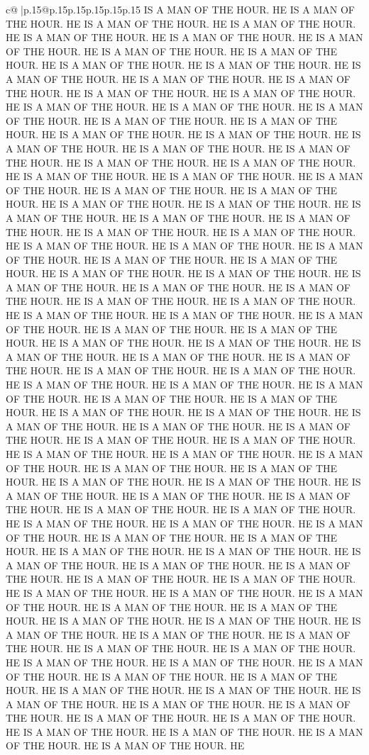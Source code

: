 \documentclass{article}
\begin{document}
{\begin{supertabular}{c@{$\;$}|p{.15\linewidth}@{}p{.15\linewidth}p{.15\linewidth}p{.15\linewidth}p{.15\linewidth}p{.15\linewidth}}
{{{IS A MAN OF THE HOUR. HE IS A MAN OF THE HOUR. HE IS A MAN OF THE HOUR. HE IS A MAN OF THE HOUR. HE IS A MAN OF THE HOUR. HE IS A MAN OF THE HOUR. HE IS A MAN OF THE HOUR. HE IS A MAN OF THE HOUR. HE IS A MAN OF THE HOUR. HE IS A MAN OF THE HOUR. HE IS A MAN OF THE HOUR. HE IS A MAN OF THE HOUR. HE IS A MAN OF THE HOUR. HE IS A MAN OF THE HOUR. HE IS A MAN OF THE HOUR. HE IS A MAN OF THE HOUR. HE IS A MAN OF THE HOUR. HE IS A MAN OF THE HOUR. HE IS A MAN OF THE HOUR. HE IS A MAN OF THE HOUR. HE IS A MAN OF THE HOUR. HE IS A MAN OF THE HOUR. HE IS A MAN OF THE HOUR. HE IS A MAN OF THE HOUR. HE IS A MAN OF THE HOUR. HE IS A MAN OF THE HOUR. HE IS A MAN OF THE HOUR. HE IS A MAN OF THE HOUR. HE IS A MAN OF THE HOUR. HE IS A MAN OF THE HOUR. HE IS A MAN OF THE HOUR. HE IS A MAN OF THE HOUR. HE IS A MAN OF THE HOUR. HE IS A MAN OF THE HOUR. HE IS A MAN OF THE HOUR. HE IS A MAN OF THE HOUR. HE IS A MAN OF THE HOUR. HE IS A MAN OF THE HOUR. HE IS A MAN OF THE HOUR. HE IS A MAN OF THE HOUR. HE IS A MAN OF THE HOUR. HE IS A MAN OF THE HOUR. HE IS A MAN OF THE HOUR. HE IS A MAN OF THE HOUR. HE IS A MAN OF THE HOUR. HE IS A MAN OF THE HOUR. HE IS A MAN OF THE HOUR. HE IS A MAN OF THE HOUR. HE IS A MAN OF THE HOUR. HE IS A MAN OF THE HOUR. HE IS A MAN OF THE HOUR. HE IS A MAN OF THE HOUR. HE IS A MAN OF THE HOUR. HE IS A MAN OF THE HOUR. HE IS A MAN OF THE HOUR. HE IS A MAN OF THE HOUR. HE IS A MAN OF THE HOUR. HE IS A MAN OF THE HOUR. HE IS A MAN OF THE HOUR. HE IS A MAN OF THE HOUR. HE IS A MAN OF THE HOUR. HE IS A MAN OF THE HOUR. HE IS A MAN OF THE HOUR. HE IS A MAN OF THE HOUR. HE IS A MAN OF THE HOUR. HE IS A MAN OF THE HOUR. HE IS A MAN OF THE HOUR. HE IS A MAN OF THE HOUR. HE IS A MAN OF THE HOUR. HE IS A MAN OF THE HOUR. HE IS A MAN OF THE HOUR. HE IS A MAN OF THE HOUR. HE IS A MAN OF THE HOUR. HE IS A MAN OF THE HOUR. HE IS A MAN OF THE HOUR. HE IS A MAN OF THE HOUR. HE IS A MAN OF THE HOUR. HE IS A MAN OF THE HOUR. HE IS A MAN OF THE HOUR. HE IS A MAN OF THE HOUR. HE IS A MAN OF THE HOUR. HE IS A MAN OF THE HOUR. HE IS A MAN OF THE HOUR. HE IS A MAN OF THE HOUR. HE IS A MAN OF THE HOUR. HE IS A MAN OF THE HOUR. HE IS A MAN OF THE HOUR. HE IS A MAN OF THE HOUR. HE IS A MAN OF THE HOUR. HE IS A MAN OF THE HOUR. HE IS A MAN OF THE HOUR. HE IS A MAN OF THE HOUR. HE IS A MAN OF THE HOUR. HE IS A MAN OF THE HOUR. HE IS A MAN OF THE HOUR. HE IS A MAN OF THE HOUR. HE IS A MAN OF THE HOUR. HE IS A MAN OF THE HOUR. HE IS A MAN OF THE HOUR. HE IS A MAN OF THE HOUR. HE IS A MAN OF THE HOUR. HE IS A MAN OF THE HOUR. HE IS A MAN OF THE HOUR. HE IS A MAN OF THE HOUR. HE IS A MAN OF THE HOUR. HE IS A MAN OF THE HOUR. HE IS A MAN OF THE HOUR. HE IS A MAN OF THE HOUR. HE IS A MAN OF THE HOUR. HE IS A MAN OF THE HOUR. HE IS A MAN OF THE HOUR. HE IS A MAN OF THE HOUR. HE IS A MAN OF THE HOUR. HE IS A MAN OF THE HOUR. HE IS A MAN OF THE HOUR. HE IS A MAN OF THE HOUR. HE IS A MAN OF THE HOUR. HE IS A MAN OF THE HOUR. HE IS A MAN OF THE HOUR. HE IS A MAN OF THE HOUR. HE IS A MAN OF THE HOUR. HE IS A MAN OF THE HOUR. HE IS A MAN OF THE HOUR. HE IS A MAN OF THE HOUR. HE IS A MAN OF THE HOUR. HE IS A MAN OF THE HOUR. HE IS A MAN OF THE HOUR. HE IS A MAN OF THE HOUR. HE }}}
\end{supertabular}}
\end{document}
